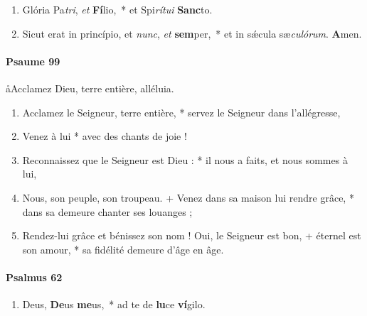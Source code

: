 \documentclass[twoside]{article}
\begin{document}
\begin{paracol}[1]{2}
\begin{enumerate}[wide, itemsep=0mm, labelwidth=!, labelindent=0pt, label=\color{gregoriocolor}\theenumi]
\item Glória Pa\textit{tri}, \textit{et} \textbf{Fí}lio,~* et Spi\textit{rí}\textit{tu}\textit{i} \textbf{Sanc}to.

\item Sicut erat in princípio, et \textit{nunc}, \textit{et} \textbf{sem}per,~* et in sǽcula sæ\textit{cu}\textit{ló}\textit{rum}. \textbf{A}men.
\end{enumerate}

\switchcolumn

\paragraph{Psaume 99}
\aa Acclamez Dieu, terre entière, alléluia.



\begin{enumerate}[wide, itemsep=0mm, labelwidth=!, labelindent=0pt, label=\color{gregoriocolor}\theenumi]

\item Acclamez le Seigneur, terre entière, *
servez le Seigneur dans l'allégresse,

\item Venez à lui *
avec des chants de joie !

\item Reconnaissez que le Seigneur est Dieu : *
il nous a faits, et nous sommes à lui,

\item Nous, son peuple, son troupeau. +
Venez dans sa maison lui rendre grâce, *
dans sa demeure chanter ses louanges ;

\item Rendez-lui grâce et bénissez son nom ! Oui, le Seigneur est bon, +
éternel est son amour, *
sa fidélité demeure d'âge en âge.


\end{enumerate}
\switchcolumn*

\paragraph{Psalmus 62}



\begin{enumerate}[wide, itemsep=0mm, labelwidth=!, labelindent=0pt, label=\color{gregoriocolor}\theenumi]
\item Deus, \textbf{De}us \textbf{me}us,~* ad te de \textbf{lu}ce \textbf{ví}gilo.


\end{enumerate}
\end{paracol}
\end{document}
